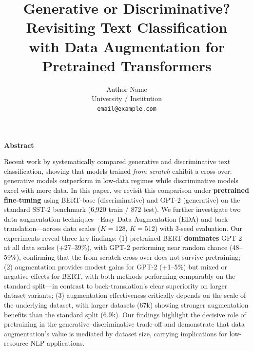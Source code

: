 \documentclass[11pt,a4paper,twocolumn]{article}
\renewenvironment{abstract}{
  \centerline{\bfseries\large Abstract}
  \vspace{0.5em}
  \normalsize
}{\par\medskip}
\begin{document}
\title{Generative or Discriminative? Revisiting Text Classification \\
       with Data Augmentation for Pretrained Transformers}

\author{Author Name \\
        University / Institution \\
        \texttt{email@example.com}}
\date{}
\maketitle

\begin{abstract}
Recent work by \cite{kasa2025} systematically compared generative and discriminative text classification, showing that models trained \textit{from scratch} exhibit a cross-over: generative models outperform in low-data regimes while discriminative models excel with more data. In this paper, we revisit this comparison under \textbf{pretrained fine-tuning} using BERT-base (discriminative) and GPT-2 (generative) on the standard SST-2 benchmark (6,920 train / 872 test). We further investigate two data augmentation techniques---Easy Data Augmentation (EDA) and back-translation---across data scales ($K{=}128$, $K{=}512$) with 3-seed evaluation. Our experiments reveal three key findings: (1) pretrained BERT \textbf{dominates} GPT-2 at all data scales (+27--39\%), with GPT-2 performing near random chance (48--59\%), confirming that the from-scratch cross-over does not survive pretraining; (2) augmentation provides modest gains for GPT-2 (+1--5\%) but mixed or negative effects for BERT, with both methods performing comparably on the standard split---in contrast to back-translation's clear superiority on larger dataset variants; (3) augmentation effectiveness critically depends on the scale of the underlying dataset, with larger datasets (67k) showing stronger augmentation benefits than the standard split (6.9k). Our findings highlight the decisive role of pretraining in the generative--discriminative trade-off and demonstrate that data augmentation's value is mediated by dataset size, carrying implications for low-resource NLP applications.
\end{abstract}
\end{document}
